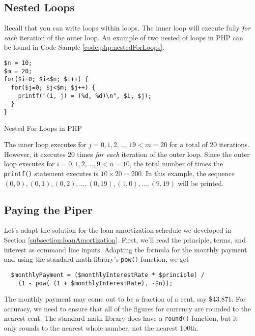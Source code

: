 \subsection{Nested Loops}

Recall that you can write loops within loops.  The inner loop will execute fully 
\emph{for each} iteration of the outer loop.  An example of two nested of
loops in PHP can be found in Code Sample \ref{code:php:nestedForLoops}.

\begin{listing}[!h]
\begin{verbatim}
$n = 10;
$m = 20;
for($i=0; $i<$n; $i++) {
  for($j=0; $j<$m; $j++) {
    printf("(i, j) = (%d, %d)\n", $i, $j);
  }
}
\end{verbatim}
  \caption{Nested For Loops in PHP}
  \label{code:php:nestedForLoops}
\end{listing}

The inner loop executes for $j = 0, 1, 2, \ldots, 19 < m = 20$ for a total
of 20 iterations.  However, it executes 20 times \emph{for each} iteration of
the outer loop.  Since the outer loop executes for $i = 0, 1, 2, \ldots, 9 < n = 10$, 
the total number of times the \texttt{printf()} statement executes is
$10 \times 20 = 200$.  In this example, the sequence $(0, 0), (0, 1), (0, 2), \ldots, (0,19), (1, 0), \ldots, (9, 19)$
will be printed.

\subsection{Paying the Piper}

Let's adapt the solution for the loan amortization schedule we developed in 
Section \ref{subsection:loanAmortization}.  First, we'll read the principle, 
terms, and interest as command line inputs. Adapting the formula for 
the monthly payment and using the standard
math library's \texttt{pow()} function, we get

\begin{verbatim}
  $monthlyPayment = ($monthlyInterestRate * $principle) / 
  	(1 - pow( (1 + $monthlyInterestRate), -$n));
\end{verbatim}

The monthly payment may come out to be a fraction of a cent, say \$43.871.  For 
accuracy, we need to ensure that all of the figures for currency are rounded
to the nearest cent.  The standard math library does have a \texttt{round()}
function, but it only rounds to the nearest whole number, not the nearest
100th.

